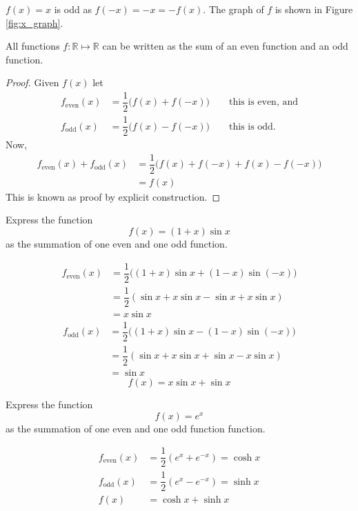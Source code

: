 \begin{example}
    $f(x)=x$ is odd as $f(-x)=-x=-f(x)$. The graph of $f$ is shown in Figure \ref{fig:x_graph}.
\end{example}

\begin{theorem}
    All functions $f:\mathbb R\mapsto\mathbb R$ can be written as the sum of an even function and an odd function.
\end{theorem}

\begin{proof}
    Given $f(x)$ let 
    \begin{align*}
        f_{\text{even}}(x)&=\dfrac12\Big(f(x)+f(-x)\Big)\qquad\text{this is even, and}\\
        f_{\text{odd}}(x)&=\dfrac12\Big(f(x)-f(-x)\Big)\qquad\text{this is odd.}
    \end{align*}
    Now,
    \begin{align*}
        f_{\text{even}}(x)+f_{\text{odd}}(x)&=\dfrac12\Big(f(x)+f(-x)+f(x)-f(-x)\Big)\\
        &=f(x)
    \end{align*}
    This is known as proof by explicit construction.
\end{proof}

\begin{example}
    Express the function \[f(x)=(1+x)\sin x\] as the summation of one even and one odd function.
    
    \begin{align*}
        f_{\text{even}}(x)&=\dfrac12\Big((1+x)\sin{x}+(1-x)\sin{(-x)}\Big)\\
        &=\dfrac12(\sin{x}+x\sin{x}-\sin{x}+x\sin{x})\\
        &=x\sin x
    \end{align*}
    \begin{align*}
        f_{\text{odd}}(x)&=\dfrac12\Big((1+x)\sin{x}-(1-x)\sin{(-x)}\Big)\\
        &=\dfrac12(\sin{x}+x\sin{x}+\sin{x}-x\sin{x})\\
        &=\sin{x}
    \end{align*}
    \[f(x)=x\sin{x}+\sin{x}\]
\end{example}

\begin{example}
    Express the function \[f(x)=e^x\] as the summation of one even and one odd function function.
    
    \begin{align*}
        f_{\text{even}}(x)&=\dfrac12(e^x+e^{-x})=\cosh{x}\\
        f_{\text{odd}}(x)&=\dfrac12(e^x-e^{-x})=\sinh{x}\\
        f(x)&=\cosh{x}+\sinh{x}
    \end{align*}
\end{example}

